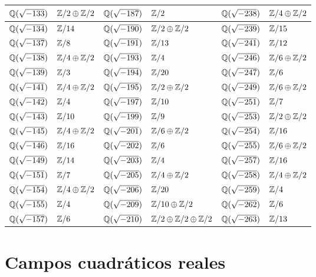 \begin{center}
\begin{tabular}{x{2cm}x{2.5cm}x{2cm}x{2.5cm}x{2cm}x{2.5cm}}
$\mathbb{Q} (\sqrt{-133})$ & $\mathbb{Z}/2\oplus\mathbb{Z}/2$ & $\mathbb{Q} (\sqrt{-187})$ & $\mathbb{Z}/2$ & $\mathbb{Q} (\sqrt{-238})$ & $\mathbb{Z}/4\oplus\mathbb{Z}/2$ \tabularnewline\hline
$\mathbb{Q} (\sqrt{-134})$ & $\mathbb{Z}/14$ & $\mathbb{Q} (\sqrt{-190})$ & $\mathbb{Z}/2\oplus\mathbb{Z}/2$ & $\mathbb{Q} (\sqrt{-239})$ & $\mathbb{Z}/15$ \tabularnewline\hline
$\mathbb{Q} (\sqrt{-137})$ & $\mathbb{Z}/8$ & $\mathbb{Q} (\sqrt{-191})$ & $\mathbb{Z}/13$ & $\mathbb{Q} (\sqrt{-241})$ & $\mathbb{Z}/12$ \tabularnewline\hline
$\mathbb{Q} (\sqrt{-138})$ & $\mathbb{Z}/4\oplus\mathbb{Z}/2$ & $\mathbb{Q} (\sqrt{-193})$ & $\mathbb{Z}/4$ & $\mathbb{Q} (\sqrt{-246})$ & $\mathbb{Z}/6\oplus\mathbb{Z}/2$ \tabularnewline\hline
$\mathbb{Q} (\sqrt{-139})$ & $\mathbb{Z}/3$ & $\mathbb{Q} (\sqrt{-194})$ & $\mathbb{Z}/20$ & $\mathbb{Q} (\sqrt{-247})$ & $\mathbb{Z}/6$ \tabularnewline\hline
$\mathbb{Q} (\sqrt{-141})$ & $\mathbb{Z}/4\oplus\mathbb{Z}/2$ & $\mathbb{Q} (\sqrt{-195})$ & $\mathbb{Z}/2\oplus\mathbb{Z}/2$ & $\mathbb{Q} (\sqrt{-249})$ & $\mathbb{Z}/6\oplus\mathbb{Z}/2$ \tabularnewline\hline
$\mathbb{Q} (\sqrt{-142})$ & $\mathbb{Z}/4$ & $\mathbb{Q} (\sqrt{-197})$ & $\mathbb{Z}/10$ & $\mathbb{Q} (\sqrt{-251})$ & $\mathbb{Z}/7$ \tabularnewline\hline
$\mathbb{Q} (\sqrt{-143})$ & $\mathbb{Z}/10$ & $\mathbb{Q} (\sqrt{-199})$ & $\mathbb{Z}/9$ & $\mathbb{Q} (\sqrt{-253})$ & $\mathbb{Z}/2\oplus\mathbb{Z}/2$ \tabularnewline\hline
$\mathbb{Q} (\sqrt{-145})$ & $\mathbb{Z}/4\oplus\mathbb{Z}/2$ & $\mathbb{Q} (\sqrt{-201})$ & $\mathbb{Z}/6\oplus\mathbb{Z}/2$ & $\mathbb{Q} (\sqrt{-254})$ & $\mathbb{Z}/16$ \tabularnewline\hline
$\mathbb{Q} (\sqrt{-146})$ & $\mathbb{Z}/16$ & $\mathbb{Q} (\sqrt{-202})$ & $\mathbb{Z}/6$ & $\mathbb{Q} (\sqrt{-255})$ & $\mathbb{Z}/6\oplus\mathbb{Z}/2$ \tabularnewline\hline
$\mathbb{Q} (\sqrt{-149})$ & $\mathbb{Z}/14$ & $\mathbb{Q} (\sqrt{-203})$ & $\mathbb{Z}/4$ & $\mathbb{Q} (\sqrt{-257})$ & $\mathbb{Z}/16$ \tabularnewline\hline
$\mathbb{Q} (\sqrt{-151})$ & $\mathbb{Z}/7$ & $\mathbb{Q} (\sqrt{-205})$ & $\mathbb{Z}/4\oplus\mathbb{Z}/2$ & $\mathbb{Q} (\sqrt{-258})$ & $\mathbb{Z}/4\oplus\mathbb{Z}/2$ \tabularnewline\hline
$\mathbb{Q} (\sqrt{-154})$ & $\mathbb{Z}/4\oplus\mathbb{Z}/2$ & $\mathbb{Q} (\sqrt{-206})$ & $\mathbb{Z}/20$ & $\mathbb{Q} (\sqrt{-259})$ & $\mathbb{Z}/4$ \tabularnewline\hline
$\mathbb{Q} (\sqrt{-155})$ & $\mathbb{Z}/4$ & $\mathbb{Q} (\sqrt{-209})$ & $\mathbb{Z}/10\oplus\mathbb{Z}/2$ & $\mathbb{Q} (\sqrt{-262})$ & $\mathbb{Z}/6$ \tabularnewline\hline
$\mathbb{Q} (\sqrt{-157})$ & $\mathbb{Z}/6$ & $\mathbb{Q} (\sqrt{-210})$ & $\mathbb{Z}/2\oplus\mathbb{Z}/2\oplus\mathbb{Z}/2$ & $\mathbb{Q} (\sqrt{-263})$ & $\mathbb{Z}/13$ \tabularnewline\hline
\end{tabular}
\end{center}

\pagebreak


\section{Campos cuadráticos reales}

